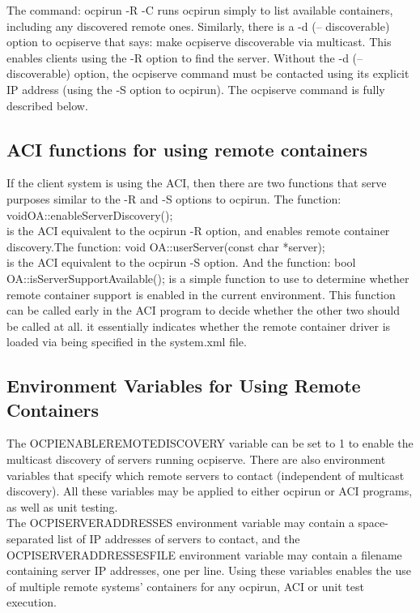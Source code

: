 \documentclass[10pt, a4paper, oneside]{article}
\renewcommand\_{\textunderscore\allowbreak} %
\begin{document}
The command: ocpirun -R -C runs ocpirun simply to list available containers, including any discovered remote ones. Similarly, there is a -d (-- discoverable) option to ocpiserve that says:  make ocpiserve discoverable via multicast.  This enables clients using the -R option to find the server. Without the -d (-- discoverable) option, the ocpiserve command must be contacted using its explicit IP address (using the -S option to ocpirun). The ocpiserve command is fully described below.
\subsection{ACI functions for using remote containers}
If the client system is using the ACI, then there are two functions that serve purposes similar to the -R and -S options to ocpirun. The function:  
voidOA::enableServerDiscovery(); \\
is the ACI equivalent to the ocpirun -R option, and enables remote container discovery.The function: 
void OA::userServer(const char *server);\\
is the ACI equivalent to the ocpirun -S option. And the function: bool OA::isServerSupportAvailable(); is a simple function to use to determine whether remote container support is enabled in the current environment.  This function can be called early in the ACI program to decide whether the other two should be called at all.  it essentially indicates whether the remote container driver is loaded via being specified in the system.xml file.
\subsection{Environment Variables for Using Remote Containers} 
The OCPI\_ENABLE\_REMOTE\_DISCOVERY variable can be set to 1 to enable the multicast discovery of servers running ocpiserve.  There are also environment variables that specify which remote servers to contact (independent of multicast discovery).  All these variables may be applied to either ocpirun or ACI programs, as well as unit testing.\\

The OCPI\_SERVER\_ADDRESSES environment variable may contain a space-separated list of IP addresses of servers to contact, and the OCPI\_SERVER\_ADDRESSES\_FILE environment variable may contain a filename containing server IP addresses, one per line.  Using these variables enables the use of multiple remote systems' containers for any ocpirun, ACI or unit test execution.\\
\end{document}
